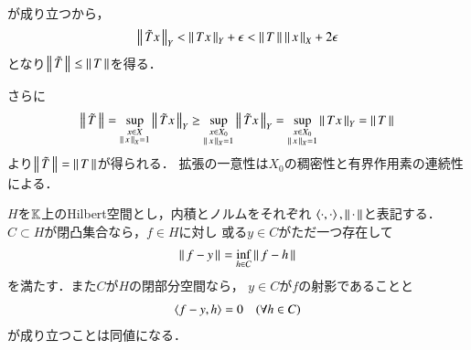 \begin{prf}
\begin{description}
\begin{align}
				\end{align}
				が成り立つから，
				\begin{align}
					\left\|\, \tilde{T}x\, \right\|_{Y} < \left\|\, Tx\, \right\|_{Y} + \epsilon < \left\|\, T\, \right\|_{} \left\|\, x\, \right\|_{X} + 2\epsilon
				\end{align}
				となり$\left\|\, \tilde{T}\, \right\|_{} \leq \left\|\, T\, \right\|_{}$を得る．
		\end{description}
		さらに
		\begin{align}
			\left\|\, \tilde{T}\, \right\|_{} = \operatorname*{sup}_{\substack{x \in X \\ \left\|\, x\, \right\|_{X} = 1}} \left\|\, \tilde{T}x\, \right\|_{Y} 
			\geq \operatorname*{sup}_{\substack{x \in X_0 \\ \left\|\, x\, \right\|_{X} = 1}} \left\|\, \tilde{T}x\, \right\|_{Y} 
			= \operatorname*{sup}_{\substack{x \in X_0 \\ \left\|\, x\, \right\|_{X} = 1}} \left\|\, Tx\, \right\|_{Y} = \left\|\, T\, \right\|_{}
		\end{align}
		より$\left\|\, \tilde{T}\, \right\|_{} = \left\|\, T\, \right\|_{}$が得られる．
		拡張の一意性は$X_0$の稠密性と有界作用素の連続性による．
		\QED
\end{prf}

\begin{screen}
	\begin{thm}[射影定理]
		$H$を$\mathbb{K}$上のHilbert空間とし，内積とノルムをそれぞれ
		$\inprod<\cdot,\cdot>,\Norm{\cdot}{}$と表記する．
		$C \subset H$が閉凸集合なら，$f \in H$に対し
		或る$y \in C$がただ一つ存在して
		\begin{align}
			\left\|\, f - y\, \right\|_{} = \operatorname*{inf}_{h \in C} \left\|\, f - h\, \right\|_{}
		\end{align}
		を満たす．また$C$が$H$の閉部分空間なら，
		$y \in C$が$f$の射影であることと
		\begin{align}
			\inprod<f-y,h> = 0 \quad (\forall h \in C)
		\end{align}
		が成り立つことは同値になる．
	\end{thm}
\end{screen}

